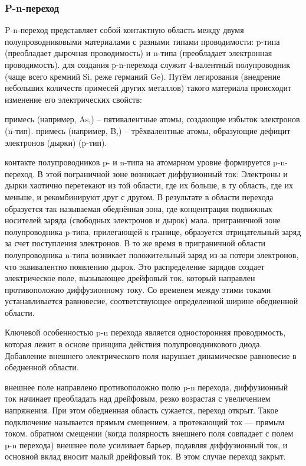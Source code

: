 \subsubsection{P-n-переход}
P-n-переход представляет собой контактную область между двумя полупроводниковыми материалами с разными типами проводимости: p-типа (преобладает дырочная проводимость) и n-типа (преобладает электронная проводимость).
 для создания p-n-перехода служит 4-валентный полупроводник (чаще всего кремний Si, реже германий Ge). Путём легирования (внедрение небольших количеств примесей других металлов) такого материала происходит изменение его электрических свойств:
\begin{itemize}
 примесь (например, As,) – пятивалентные атомы, создающие избыток электронов (n-тип).
 примесь (например, B,) – трёхвалентные атомы, образующие дефицит электронов (дырки) (p-тип).
\end{itemize}
 контакте полупроводников p- и n-типа на атомарном уровне формируется p-n-переход. В этой пограничной зоне возникает диффузионный ток: Электроны и дырки хаотично перетекают из той области,
где их больше, в ту область, где их меньше, и рекомбинируют друг с другом.
В результате в области перехода образуется так называемая обеднённая зона, где концентрация подвижных носителей заряда (свободных электронов и дырок) мала.
 приграничной зоне полупроводника p-типа, прилегающей к границе, образуется отрицательный заряд за счет поступления электронов. В то же время в приграничной области полупроводника n-типа возникает положительный заряд из-за потери электронов, что эквивалентно появлению дырок. Это распределение зарядов создает электрическое поле, вызывающее дрейфовый ток, который направлен противоположно диффузионному току. Со временем между этими токами устанавливается равновесие, соответствующее определенной ширине обедненной области.

Ключевой особенностью p-n перехода является односторонняя проводимость, которая лежит в основе принципа действия полупроводникового диода. Добавление внешнего электрического поля нарушает динамическое равновесие в обедненной области.
\begin{itemize}
 внешнее поле направлено противоположно полю p-n перехода, диффузионный ток начинает преобладать над дрейфовым, резко возрастая с увеличением напряжения. При этом обедненная область сужается, переход открыт. Такое подключение называется прямым смещением, а протекающий ток — прямым током.
 обратном смещении (когда полярность внешнего поля совпадает с полем p-n перехода) внешнее поле усиливает барьер, подавляя диффузионный ток, и основной вклад вносит малый дрейфовый ток. В этом случае переход закрыт.
\end{itemize}
